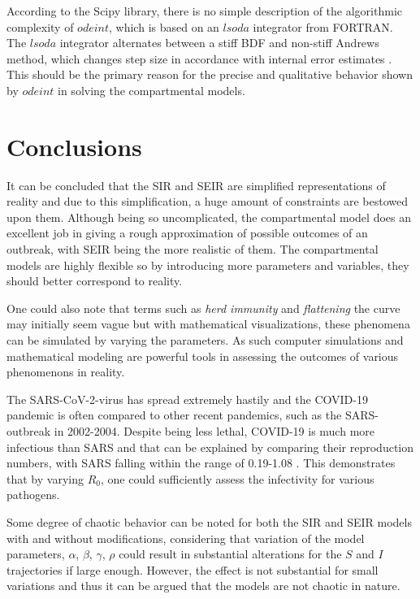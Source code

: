 \documentclass[12pt]{article}
\begin{document}
According to the Scipy library, there is no simple description of the 
algorithmic complexity of $odeint$, which is based on an $lsoda$ integrator 
from FORTRAN. The $lsoda$ integrator alternates between a stiff BDF and 
non-stiff Andrews method, which changes step size in accordance with 
internal error estimates \cite{scipy}.  This should be the primary 
reason for the precise and qualitative behavior shown by $odeint$ 
in solving the compartmental models. 

\newpage
\section{Conclusions}
It can be concluded that the SIR and SEIR are simplified representations 
of reality and due to this simplification, a huge amount of constraints 
are bestowed upon them. Although being so uncomplicated, the compartmental 
model does an excellent job in giving a rough approximation of possible 
outcomes of an outbreak, with SEIR being the more realistic of them. 
The compartmental models are highly flexible so by introducing more 
parameters and variables, they should better correspond to reality. 

One could also note that terms such as \textit{herd immunity} and 
\textit{flattening} the curve may initially seem vague but with 
mathematical visualizations, these phenomena can be simulated 
by varying the parameters. As such computer simulations and
mathematical modeling are powerful tools in assessing the 
outcomes of various phenomenons in reality. 
  
The SARS-CoV-2-virus has spread extremely hastily and the COVID-19 pandemic 
is often compared to other recent pandemics, such as the SARS-outbreak in 2002-2004. 
Despite being less lethal, COVID-19 is much more infectious than SARS and that can 
be explained by comparing their reproduction numbers, with SARS falling 
within the range of 0.19-1.08 \cite{chowell}. This demonstrates that by varying $R_0$, 
one could sufficiently assess the infectivity for various pathogens.

Some degree of chaotic behavior can be noted for both the SIR and SEIR models with 
and without modifications, considering that variation of the model parameters, 
$\alpha$, $\beta$, $\gamma$, $\rho$ could result in substantial alterations for 
the  $S$ and  $I$ trajectories if large enough. However, the effect is not substantial 
for small variations and thus it can be argued that the models are not chaotic in nature.
\end{document}
